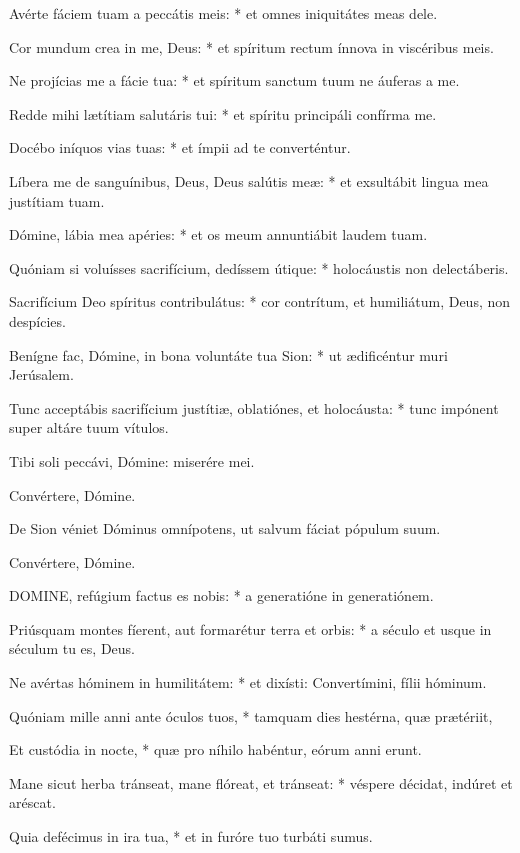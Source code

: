 Avérte fáciem tuam a peccátis meis: * et omnes iniquitátes meas dele.

Cor mundum crea in me, Deus: * et spíritum rectum ínnova in viscéribus meis.

Ne projícias me a fácie tua: * et spíritum sanctum tuum ne áuferas a me.

Redde mihi lætítiam salutáris tui: * et spíritu principáli confírma me.

Docébo iníquos vias tuas: * et ímpii ad te converténtur.

Líbera me de sanguínibus, Deus, Deus salútis meæ: * et exsultábit lingua mea justítiam tuam.

Dómine, lábia mea apéries: * et os meum annuntiábit laudem tuam.

Quóniam si voluísses sacrifícium, dedíssem útique: * holocáustis non delectáberis.

Sacrifícium Deo spíritus contribulátus: * cor contrítum, et humiliátum, Deus, non despícies.

Benígne fac, Dómine, in bona voluntáte tua Sion: * ut ædificéntur muri Jerúsalem.

Tunc acceptábis sacrifícium justítiæ, oblatiónes, et holocáusta: * tunc impónent super altáre tuum vítulos.

 Tibi soli peccávi, Dómine: miserére mei.

 Convértere, Dómine.

  De Sion véniet Dóminus omnípotens, ut salvum fáciat pópulum suum.

 Convértere, Dómine.


\lettrine[lines=2]{D}{OMINE}, refúgium factus es nobis: * a generatióne in generatiónem.

Priúsquam montes fíerent, aut formarétur terra et orbis: * a século et usque in séculum tu es, Deus.

Ne avértas hóminem in humilitátem: * et dixísti: Convertímini, fílii hóminum.

Quóniam mille anni ante óculos tuos, * tamquam dies hestérna, quæ prætériit,

Et custódia in nocte, * quæ pro níhilo habéntur, eórum anni erunt.

Mane sicut herba tránseat, mane flóreat, et tránseat: * véspere décidat, indúret et aréscat.

Quia defécimus in ira tua, * et in furóre tuo turbáti sumus.

